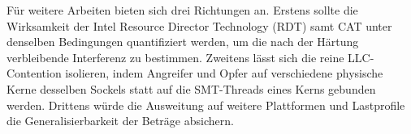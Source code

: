 \documentclass[conference]{IEEEtran}
\begin{document}
Für weitere Arbeiten bieten sich drei Richtungen an. Erstens sollte die Wirksamkeit der Intel Resource Director Technology (RDT) samt CAT unter denselben Bedingungen quantifiziert werden, um die nach der Härtung verbleibende Interferenz zu bestimmen. Zweitens lässt sich die reine LLC-Contention isolieren, indem Angreifer und Opfer auf verschiedene physische Kerne desselben Sockels statt auf die SMT-Threads eines Kerns gebunden werden. Drittens würde die Ausweitung auf weitere Plattformen und Lastprofile die Generalisierbarkeit der Beträge absichern.



\end{document}
